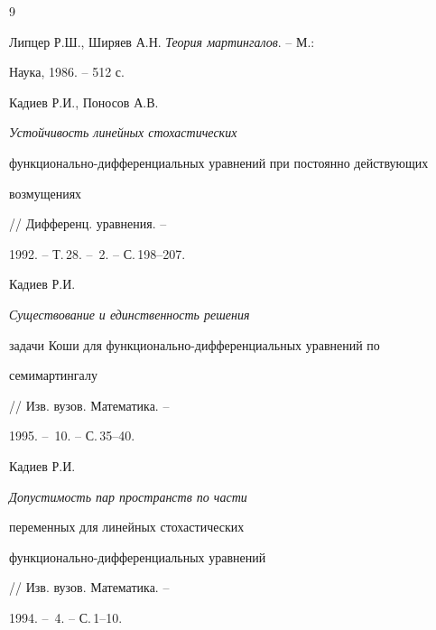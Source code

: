 \begin{thebibliography}{9}







Липцер Р.Ш., Ширяев А.Н. {\it Теория мартингалов}. -- М.: 


Наука, 1986. -- 512 с.




Кадиев Р.И., Поносов А.В. {\it Устойчивость линейных стохастических 


функционально-дифференциальных уравнений при постоянно действующих 


возмущениях} // Дифференц. уравнения. --


1992. -- Т.\,28. -- \No\,2. -- С.\,198--207. 




Кадиев Р.И. {\it Существование и единственность решения 


задачи Коши для функционально-дифференциальных уравнений по 


семимартингалу} // Изв. вузов. Математика. --


1995. -- \No\,10. -- С.\,35--40.




Кадиев Р.И. {\it Допустимость пар пространств по части 


переменных для линейных стохастических 


функционально-дифференциальных уравнений} 


// Изв. вузов. Математика. --


1994. -- \No\,4. -- С.\,1--10. \\





\end{thebibliography}





\vskip 2cm














\label{end}





